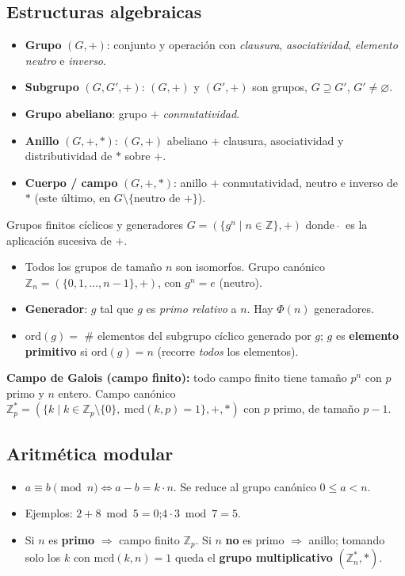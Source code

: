 \documentclass[11pt,a4paper]{article}
\newcommand{\Zn}{\mathbb{Z}}
\newcommand{\mcd}{\mathrm{mcd}}
\newcommand{\ord}{\mathrm{ord}}
\begin{document}
\subsection{Estructuras algebraicas}
\begin{itemize}[leftmargin=1.4em,itemsep=2pt]
  \item \textbf{Grupo} $(G,+)$: conjunto y operación con \emph{clausura}, \emph{asociatividad},
        \emph{elemento neutro} e \emph{inverso}.
  \item \textbf{Subgrupo} $(G,G',+)$: $(G,+)$ y $(G',+)$ son grupos, $G\supseteq G'$, $G'\neq\varnothing$.
  \item \textbf{Grupo abeliano}: grupo $+$ \emph{conmutatividad}.
  \item \textbf{Anillo} $(G,+,\ast)$: $(G,+)$ abeliano $+$ clausura, asociatividad y
        distributividad de $\ast$ sobre $+$.
  \item \textbf{Cuerpo / campo} $(G,+,\ast)$: anillo $+$ conmutatividad, neutro e inverso de
        $\ast$ (este último, en $G\setminus\{\text{neutro de }+\}$).
\end{itemize}

\begin{defbox}{Grupos finitos cíclicos y generadores}
$G=(\{g^n \mid n\in\Zn\},+)$ donde $\,\hat{}\,$ es la aplicación sucesiva de $+$.
\begin{itemize}[leftmargin=1.4em,itemsep=1pt]
  \item Todos los grupos de tamaño $n$ son isomorfos. Grupo canónico
        $\Zn_n=(\{0,1,\dots,n-1\},+)$, con $g^n=e$ (neutro).
  \item \textbf{Generador}: $g$ tal que $g$ es \emph{primo relativo} a $n$. Hay $\Phi(n)$
        generadores.
  \item $\ord(g)=$ \# elementos del subgrupo cíclico generado por $g$; $g$ es
        \textbf{elemento primitivo} si $\ord(g)=n$ (recorre \emph{todos} los elementos).
\end{itemize}
\end{defbox}

\begin{slidebox}
\textbf{Campo de Galois (campo finito):} todo campo finito tiene tamaño $p^n$ con $p$ primo y
$n$ entero. Campo canónico $\Zn_p^{\ast}=(\{k\mid k\in\Zn_p\setminus\{0\},\ \mcd(k,p)=1\},+,\ast)$
con $p$ primo, de tamaño $p-1$.
\end{slidebox}

\subsection{Aritmética modular}
\begin{itemize}[leftmargin=1.4em,itemsep=1pt]
  \item $a \equiv b \pmod n \iff a-b = k\cdot n$. Se reduce al grupo canónico $0\le a < n$.
  \item Ejemplos: $2+8 \bmod 5 = 0$;\quad $4\cdot 3 \bmod 7 = 5$.
  \item Si $n$ es \textbf{primo} $\Rightarrow$ campo finito $\Zn_p$. Si $n$ \textbf{no} es primo
        $\Rightarrow$ anillo; tomando solo los $k$ con $\mcd(k,n)=1$ queda el \textbf{grupo
        multiplicativo} $(\Zn_n^{\ast},\ast)$.
\end{itemize}
\end{document}
